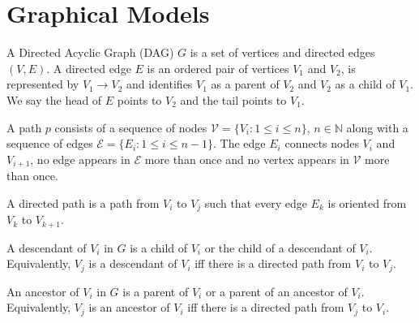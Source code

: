 


\section{Graphical Models}


\begin{definition}
A Directed Acyclic Graph (DAG) $G$ is a set of vertices and directed edges $(V,E)$. A directed edge $E$ is an ordered pair of vertices $V_1$ and $V_2$, is represented by $V_1 \to V_2$ and identifies $V_1$ as a parent of $V_2$ and $V_2$ as a child of $V_1$. We say the head of $E$ points to $V_2$ and the tail points to $V_1$.
\end{definition}

\begin{definition}
A path $p$ consists of a sequence of nodes $\mathcal{V}=\{V_i:1\leq i \leq n\}$, $n\in\mathbb{N}$ along with a sequence of edges $\mathcal{E}=\{E_i:1\leq i \leq n-1\}$. The edge $E_i$ connects nodes $V_i$ and $V_{i+1}$, no edge appears in $\mathcal{E}$ more than once and no vertex appears in $\mathcal{V}$ more than once.

A directed path is a path from $V_i$ to $V_j$ such that every edge $E_k$ is oriented from $V_k$ to $V_{k+1}$.
\end{definition}

\begin{definition}\label{def:descendants_and_ancestors}
A descendant of $V_i$ in $G$ is a child of $V_i$ or the child of a descendant of $V_i$. Equivalently, $V_j$ is a descendant of $V_i$ iff there is a directed path from $V_i$ to $V_j$.

An ancestor of $V_i$ in $G$ is a parent of $V_i$ or a parent of an ancestor of $V_i$. Equivalently, $V_j$ is an ancestor of $V_i$ iff there is a directed path from $V_j$ to $V_i$.
\end{definition}

